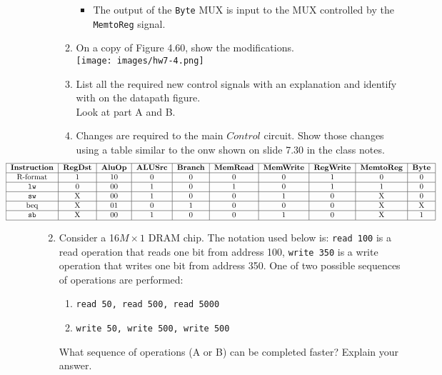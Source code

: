 \documentclass[10pt,letterpaper]{article}
\begin{document}
\begin{enumerate}[label=\textbf{Problem \arabic*.}]
\begin{enumerate}[label=\Alph*)]
\begin{itemize}
			\item The output of the \texttt{Byte} MUX is input to the MUX controlled by the \texttt{MemtoReg} signal. 
		\end{itemize}
	\item On a copy of Figure 4.60, show the modifications.\\
	\hspace*{-2cm}\texttt{[image: images/hw7-4.png]}
	\item List all the required new control signals with an explanation and identify with on the datapath figure.\\
	Look at part A and B. 
	\item Changes are required to the main $Control$ circuit. Show those changes using a table similar to the onw shown on slide 7.30 in the class notes.\[
	\hspace*{-3.25cm}\begin{tabular} { |c|c|c|c|c|c|c|c|c|c| }
	\hline
	\textbf{Instruction} & \textbf{RegDst} & \textbf{AluOp} & \textbf{ALUSrc} & \textbf{Branch} & \textbf{MemRead} & \textbf{MemWrite} & \textbf{RegWrite} & \textbf{MemtoReg} & \textbf{Byte} \\
	\hline
	R-format & 1 & 10 & 0 & 0 & 0 & 0 & 1 & 0 & 0 \\
	\hline
	\texttt{lw} & 0 & 00 & 1 & 0 & 1 & 0 & 1 & 1 & 0\\
	\hline
	\texttt{sw} & X & 00 & 1 & 0 & 0 & 1 & 0 & X & 0\\
	\hline
	beq & X & 01 & 0 & 1 & 0 & 0 & 0 & X & X\\
	\hline
	\texttt{sb} & X & 00 & 1 & 0 & 0 & 1 & 0 & X & 1\\
	\hline
	\end{tabular}
	\]
	\end{enumerate}
\item Consider a 16$M \times 1$ DRAM chip. The notation used below is: \texttt{read 100} is a read operation that reads one bit from address 100, \texttt{write 350} is a write operation that writes one bit from address 350. One of two possible sequences of operations are performed:
	\begin{enumerate}[label=\Alph*)]
	\item \texttt{read 50, read 500, read 5000}
	\item \texttt{write 50, write 500, write 500}
	\end{enumerate}
What sequence of operations (A or B) can be completed faster? Explain your answer.\\

\end{enumerate}
\end{document}
